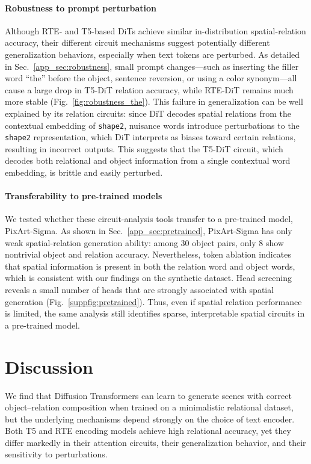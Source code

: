 \paragraph{Robustness to prompt perturbation}
Although RTE- and T5-based DiTs achieve similar in-distribution spatial-relation accuracy, their different circuit mechanisms suggest potentially different generalization behaviors, especially when text tokens are perturbed. As detailed in Sec.~\ref{app_sec:robustness}, small prompt changes---such as inserting the filler word ``the'' before the object, sentence reversion, or using a color synonym---all cause a large drop in T5-DiT relation accuracy, while RTE-DiT remains much more stable (Fig.~\ref{fig:robustness_the}).
This failure in generalization can be well explained by its relation circuits: since DiT decodes spatial relations from the contextual embedding of \texttt{shape2}, nuisance words introduce perturbations to the \texttt{shape2} representation, which DiT interprets as biases toward certain relations, resulting in incorrect outputs.
This suggests that the T5-DiT circuit, which decodes both relational and object information from a single contextual word embedding, is brittle and easily perturbed.

\paragraph{Transferability to pre-trained models}
We tested whether these circuit-analysis tools transfer to a pre-trained model, PixArt-Sigma. As shown in Sec.~\ref{app_sec:pretrained}, PixArt-Sigma has only weak spatial-relation generation ability: among 30 object pairs, only 8 show nontrivial object and relation accuracy. Nevertheless, token ablation indicates that spatial information is present in both the relation word and object words, which is consistent with our findings on the synthetic dataset. Head screening reveals a small number of heads that are strongly associated with spatial generation (Fig.~\ref{suppfig:pretrained}). Thus, even if spatial relation performance is limited, the same analysis still identifies sparse, interpretable spatial circuits in a pre-trained model.

\section{Discussion}

We find that Diffusion Transformers can learn to generate scenes with correct object--relation composition when trained on a minimalistic relational dataset, but the underlying mechanisms depend strongly on the choice of text encoder. Both T5 and RTE encoding models achieve high relational accuracy, yet they differ markedly in their attention circuits, their generalization behavior, and their sensitivity to perturbations.

